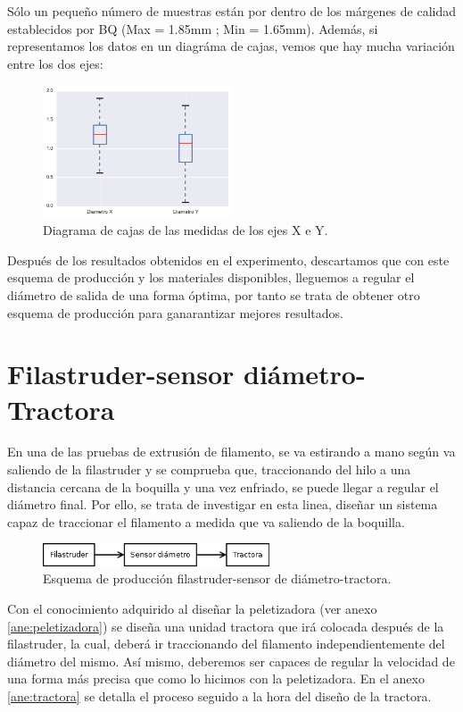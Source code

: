 Sólo un pequeño número de muestras están por dentro de los márgenes de calidad establecidos por BQ (Max = 1.85mm ; Min = 1.65mm). Además, si representamos los datos en un diagráma de cajas, vemos que hay mucha variación entre los dos ejes:
\begin{figure}[H]
    \centering
    \includegraphics[width=0.5\textwidth]{images/producciones/16062015/output_10_1.png}
    \caption{Diagrama de cajas de las medidas de los ejes X e Y.}
    \label{fig:prod_boxplot}
\end{figure}

Después de los resultados obtenidos en el experimento, descartamos que con este esquema de producción y los materiales disponibles, lleguemos a regular el diámetro de salida de una forma óptima, por tanto se trata de obtener otro esquema de producción para ganarantizar mejores resultados.

\section{Filastruder-sensor diámetro-Tractora}
\label{sec:FST}

En una de las pruebas de extrusión de filamento, se va estirando a mano según va saliendo de la filastruder y se comprueba que, traccionando del hilo a una distancia cercana de la boquilla y una vez enfriado, se puede llegar a regular el diámetro final. Por ello, se trata de investigar en esta linea, diseñar un sistema capaz de traccionar el filamento a medida que va saliendo de la boquilla.

\begin{figure}[H]
    \centering
    \includegraphics[width=0.6\textwidth]{images/producciones/Diagram2.png}
    \caption{Esquema de producción filastruder-sensor de diámetro-tractora.}
    \label{fig:esquemap_FST}
\end{figure}

Con el conocimiento adquirido al diseñar la peletizadora (ver anexo \ref{ane:peletizadora}) se diseña una unidad tractora que irá colocada después de la filastruder, la cual, deberá ir traccionando del filamento independientemente del diámetro del mismo. Así mismo, deberemos ser capaces de regular la velocidad de una forma más precisa que como lo hicimos con la peletizadora. En el anexo \ref{ane:tractora} se detalla el proceso seguido a la hora del diseño de la tractora.\\

